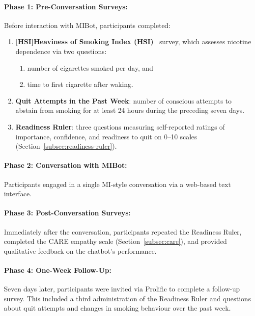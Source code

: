 \paragraph{Phase 1: Pre-Conversation Surveys:}
Before interaction with MIBot, participants completed:
\begin{enumerate}
    \item \textbf{[HSI]Heaviness of Smoking Index (HSI)}~\citep{heatherton1989measuring} survey, which assesses nicotine dependence via two questions:
        \begin{enumerate}
            \item number of cigarettes smoked per day, and
            \item time to first cigarette after waking.
        \end{enumerate}
    \item \textbf{Quit Attempts in the Past Week}: number of conscious attempts to abstain from smoking for at least 24 hours during the preceding seven days.
    \item \textbf{Readiness Ruler}: three questions measuring self-reported ratings of importance, confidence, and readiness to quit on 0–10 scales (Section~\ref{subsec:readiness-ruler}).
\end{enumerate}

\paragraph{Phase 2: Conversation with MIBot:}
Participants engaged in a single MI-style conversation via a web-based text interface.

\paragraph{Phase 3: Post-Conversation Surveys:}
Immediately after the conversation, participants repeated the Readiness Ruler, completed the CARE empathy scale (Section~\ref{subsec:care}), and provided qualitative feedback on the chatbot's performance.

\paragraph{Phase 4: One-Week Follow-Up:}
Seven days later, participants were invited via Prolific to complete a follow-up survey. This included a third administration of the Readiness Ruler and questions about quit attempts and changes in smoking behaviour over the past week.

